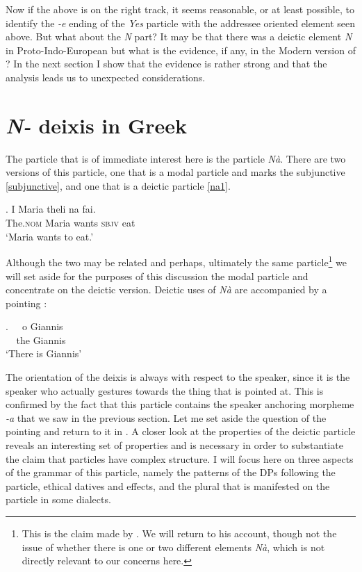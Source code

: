 \documentclass[output=paper]{LSP/langsci}
\begin{document}
Now if the above is on the right track, it seems reasonable, or at least possible, to identify the \textit{-e} ending of the \textit{Yes} particle \nai with the addressee oriented element seen above.  But what about the \textit{N} part?  It may be that there was a deictic element \textit{N} in Proto-Indo-European but what is the evidence, if any, in the Modern version of ?  In the next section I show that the evidence is rather strong and that the analysis leads us to unexpected considerations.


\section{\textit{N-} deixis in Greek}
\label{sec4}
The particle that is of immediate interest here is the particle \textit{N\`{a}}.  There are two versions of this particle, one that is a modal particle and marks the subjunctive \ref{subjunctive}, and one that is a deictic particle \ref{na1}.

\exg. 
I Maria theli na fai.\\
The.\textsc{nom} Maria wants \textsc{sbjv} eat\\ \label{subjunctive}
\glt `Maria wants to eat.'

 Although the two may be related and perhaps, ultimately the same particle\footnote{This is the claim made by \citet{christidis:90}.  We will return to his account, though not the issue of whether there is one or two different elements \textit{N\`{a}}, which is not directly relevant to our concerns here.} we will set aside for the purposes of this discussion the modal particle and concentrate on the deictic version.  Deictic uses of \textit{N\`{a}} are accompanied by a pointing :

\exg.
\na $\ $  \xspace\Pointinghand $\ $ o Giannis\\
\na $\ $ \xspace\Pointinghand $\ $ the Giannis\\ \label{na1}
\glt `There is Giannis'


The orientation of the deixis is always with respect to the speaker, since it is the speaker who actually gestures towards the thing that is pointed at.  This is confirmed by the fact that this particle contains the speaker anchoring morpheme \textit{-a} that we saw in the previous section.  Let me set aside the {question} of the pointing  and return to it in .  A closer look at the properties of the deictic particle \na reveals an interesting set of properties and is necessary in order to substantiate the claim that particles have complex structure.  I will focus here on three aspects of the grammar of this particle, namely the  patterns of the DPs following the particle, ethical datives and  effects, and the plural  that is manifested on the particle in some dialects.
\end{document}
